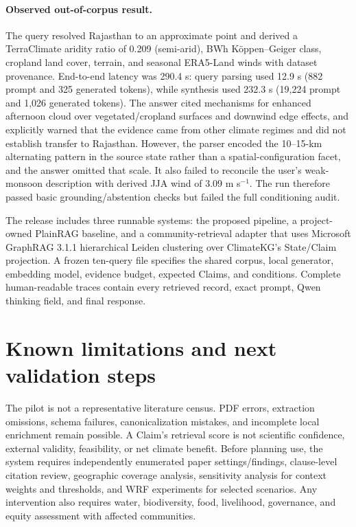 \paragraph{Observed out-of-corpus result.}
The query resolved Rajasthan to an approximate point and derived a TerraClimate aridity ratio of 0.209 (semi-arid), BWh K\"oppen--Geiger class, cropland land cover, terrain, and seasonal ERA5-Land winds with dataset provenance. End-to-end latency was 290.4 s: query parsing used 12.9 s (882 prompt and 325 generated tokens), while synthesis used 232.3 s (19,224 prompt and 1,026 generated tokens). The answer cited mechanisms for enhanced afternoon cloud over vegetated/cropland surfaces and downwind edge effects, and explicitly warned that the evidence came from other climate regimes and did not establish transfer to Rajasthan. However, the parser encoded the 10--15-km alternating pattern in the source state rather than a spatial-configuration facet, and the answer omitted that scale. It also failed to reconcile the user's weak-monsoon description with derived JJA wind of 3.09 m s$^{-1}$. The run therefore passed basic grounding/abstention checks but failed the full conditioning audit.

The release includes three runnable systems: the proposed pipeline, a project-owned PlainRAG baseline, and a community-retrieval adapter that uses Microsoft GraphRAG 3.1.1 hierarchical Leiden clustering over ClimateKG's State/Claim projection. A frozen ten-query file specifies the shared corpus, local generator, embedding model, evidence budget, expected Claims, and conditions. Complete human-readable traces contain every retrieved record, exact prompt, Qwen thinking field, and final response.

\section{Known limitations and next validation steps}
The pilot is not a representative literature census. PDF errors, extraction omissions, schema failures, canonicalization mistakes, and incomplete local enrichment remain possible. A Claim's retrieval score is not scientific confidence, external validity, feasibility, or net climate benefit. Before planning use, the system requires independently enumerated paper settings/findings, clause-level citation review, geographic coverage analysis, sensitivity analysis for context weights and thresholds, and WRF experiments for selected scenarios. Any intervention also requires water, biodiversity, food, livelihood, governance, and equity assessment with affected communities.
